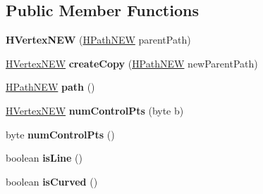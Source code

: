 \subsection*{Public Member Functions}
\begin{DoxyCompactItemize}
\item 
\hypertarget{classhype_1_1extended_1_1util_1_1_h_vertex_n_e_w_a18d2663e99513e0c9d950c212b0ef927}{{\bfseries H\-Vertex\-N\-E\-W} (\hyperlink{classhype_1_1extended_1_1drawable_1_1_h_path_n_e_w}{H\-Path\-N\-E\-W} parent\-Path)}\label{classhype_1_1extended_1_1util_1_1_h_vertex_n_e_w_a18d2663e99513e0c9d950c212b0ef927}

\item 
\hypertarget{classhype_1_1extended_1_1util_1_1_h_vertex_n_e_w_a0b52d4d28d6727bd49bbfa9d22b2b02c}{\hyperlink{classhype_1_1extended_1_1util_1_1_h_vertex_n_e_w}{H\-Vertex\-N\-E\-W} {\bfseries create\-Copy} (\hyperlink{classhype_1_1extended_1_1drawable_1_1_h_path_n_e_w}{H\-Path\-N\-E\-W} new\-Parent\-Path)}\label{classhype_1_1extended_1_1util_1_1_h_vertex_n_e_w_a0b52d4d28d6727bd49bbfa9d22b2b02c}

\item 
\hypertarget{classhype_1_1extended_1_1util_1_1_h_vertex_n_e_w_a14114a96f79a072b48ddb511d0d40431}{\hyperlink{classhype_1_1extended_1_1drawable_1_1_h_path_n_e_w}{H\-Path\-N\-E\-W} {\bfseries path} ()}\label{classhype_1_1extended_1_1util_1_1_h_vertex_n_e_w_a14114a96f79a072b48ddb511d0d40431}

\item 
\hypertarget{classhype_1_1extended_1_1util_1_1_h_vertex_n_e_w_a32bd06045eb4ea123dc23b1845c2a06e}{\hyperlink{classhype_1_1extended_1_1util_1_1_h_vertex_n_e_w}{H\-Vertex\-N\-E\-W} {\bfseries num\-Control\-Pts} (byte b)}\label{classhype_1_1extended_1_1util_1_1_h_vertex_n_e_w_a32bd06045eb4ea123dc23b1845c2a06e}

\item 
\hypertarget{classhype_1_1extended_1_1util_1_1_h_vertex_n_e_w_abed4dbf3ac0aa08a82155cccb9629734}{byte {\bfseries num\-Control\-Pts} ()}\label{classhype_1_1extended_1_1util_1_1_h_vertex_n_e_w_abed4dbf3ac0aa08a82155cccb9629734}

\item 
\hypertarget{classhype_1_1extended_1_1util_1_1_h_vertex_n_e_w_affbad16a48439623716d677bbd08c024}{boolean {\bfseries is\-Line} ()}\label{classhype_1_1extended_1_1util_1_1_h_vertex_n_e_w_affbad16a48439623716d677bbd08c024}

\item 
\hypertarget{classhype_1_1extended_1_1util_1_1_h_vertex_n_e_w_a4b8ec289a4a71fee8ea27d8e2dd7c650}{boolean {\bfseries is\-Curved} ()}\label{classhype_1_1extended_1_1util_1_1_h_vertex_n_e_w_a4b8ec289a4a71fee8ea27d8e2dd7c650}


\end{DoxyCompactItemize}
